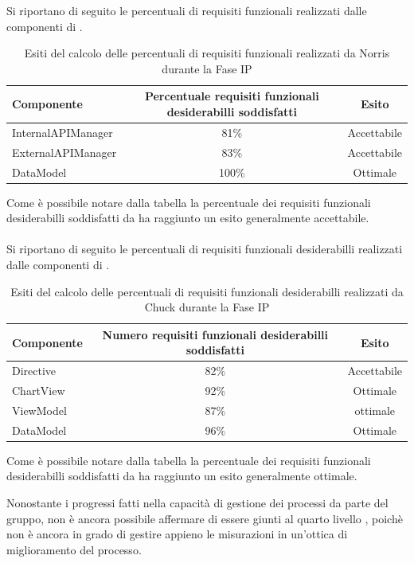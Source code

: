 
Si riportano di seguito le percentuali di requisiti funzionali realizzati dalle componenti di .
\begin{table}[H]
	\centering
		\begin{tabu}{| l | c | c |}
			\hline
			Componente	& Percentuale requisiti funzionali desiderabilli soddisfatti	& Esito		\\ \hline \hline
			InternalAPIManager	& 81\% 	& Accettabile  \\ \hline
			ExternalAPIManager  & 	83\%	& Accettabile  \\ \hline
			DataModel  & 	100\%	& Ottimale  \\ \hline
		\end{tabu}
	\caption{Esiti del calcolo delle percentuali di requisiti funzionali realizzati da Norris durante la Fase IP}
\end{table}
Come è possibile notare dalla tabella la percentuale dei requisiti funzionali desiderabilli soddisfatti da  ha raggiunto un esito generalmente accettabile. 
\\ \\
Si riportano di seguito le percentuali di requisiti funzionali desiderabilli realizzati dalle componenti di .
\begin{table}[H]
	\centering
		\begin{tabu}{| l | c | c |}
			\hline
			Componente	& Numero requisiti funzionali desiderabilli soddisfatti	& Esito		\\ \hline \hline
			Directive	& 82\% 	& Accettabile  \\ \hline
			ChartView  & 	92\%	& Ottimale  \\ \hline
			ViewModel  & 	87\%	& ottimale  \\ \hline
			DataModel  & 	96\%	& Ottimale  \\ \hline
		\end{tabu}
	\caption{Esiti del calcolo delle percentuali di requisiti funzionali desiderabilli realizzati da Chuck durante la Fase IP}
\end{table}
Come è possibile notare dalla tabella la percentuale dei requisiti funzionali desiderabilli soddisfatti da  ha raggiunto un esito generalmente ottimale.



	Nonostante i progressi fatti nella capacità di gestione dei processi da parte del gruppo, non è ancora possibile affermare di essere giunti al quarto livello , poichè non è ancora in grado di gestire appieno le misurazioni in un'ottica di miglioramento del processo.

